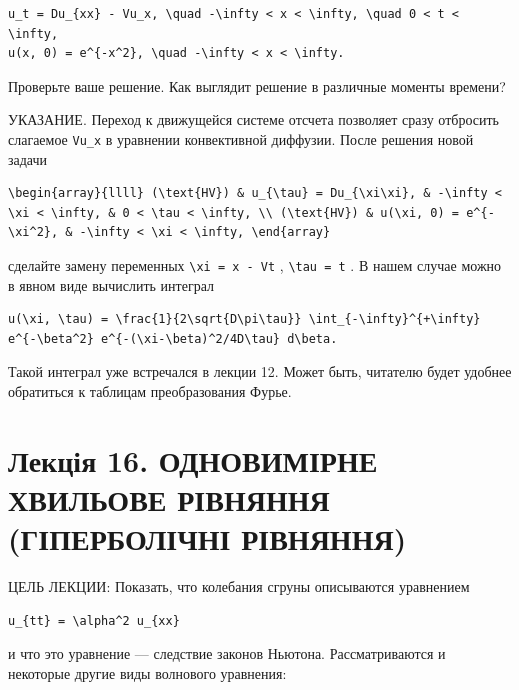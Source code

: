 \documentclass[
  ukrainian,
]{article}
\begin{document}
\begin{verbatim}
u_t = Du_{xx} - Vu_x, \quad -\infty < x < \infty, \quad 0 < t < \infty,
u(x, 0) = e^{-x^2}, \quad -\infty < x < \infty.
\end{verbatim}

Проверьте ваше решение. Как выглядит решение в различные моменты
времени?

УКАЗАНИЕ. Переход к движущейся системе отсчета позволяет сразу отбросить
слагаемое \texttt{Vu\_x} в уравнении конвективной диффузии. После
решения новой задачи

\begin{verbatim}
\begin{array}{llll} (\text{HV}) & u_{\tau} = Du_{\xi\xi}, & -\infty < \xi < \infty, & 0 < \tau < \infty, \\ (\text{HV}) & u(\xi, 0) = e^{-\xi^2}, & -\infty < \xi < \infty, \end{array}
\end{verbatim}

сделайте замену переменных \texttt{\textbackslash{}xi\ =\ x\ -\ Vt} ,
\texttt{\textbackslash{}tau\ =\ t} . В нашем случае можно в явном виде
вычислить интеграл

\begin{verbatim}
u(\xi, \tau) = \frac{1}{2\sqrt{D\pi\tau}} \int_{-\infty}^{+\infty} e^{-\beta^2} e^{-(\xi-\beta)^2/4D\tau} d\beta.
\end{verbatim}

Такой интеграл уже встречался в лекции 12. Может быть, читателю будет
удобнее обратиться к таблицам преобразования Фурье.

\section{Лекція 16. ОДНОВИМІРНЕ ХВИЛЬОВЕ РІВНЯННЯ (ГІПЕРБОЛІЧНІ
РІВНЯННЯ)}\label{ux43bux435ux43aux446ux456ux44f-16.-ux43eux434ux43dux43eux432ux438ux43cux456ux440ux43dux435-ux445ux432ux438ux43bux44cux43eux432ux435-ux440ux456ux432ux43dux44fux43dux43dux44f-ux433ux456ux43fux435ux440ux431ux43eux43bux456ux447ux43dux456-ux440ux456ux432ux43dux44fux43dux43dux44f}

ЦЕЛЬ ЛЕКЦИИ: Показать, что колебания сгруны описываются уравнением

\begin{verbatim}
u_{tt} = \alpha^2 u_{xx}
\end{verbatim}

и что это уравнение --- следствие законов Ньютона. Рассматриваются и
некоторые другие виды волнового уравнения:
\end{document}
